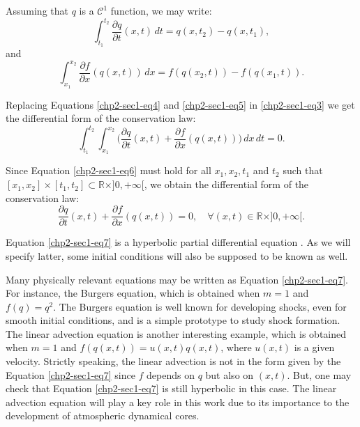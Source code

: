 Assuming that ${q}$ is a $\mathcal{C}^1$ function, we may write:
\begin{equation}
	\label{chp2-sec1-eq4}
	\int_{t_1}^{t_2} 
	\frac{\partial q}{\partial t}(x,t) \,dt
	= {q}(x, t_2) - {q}(x, t_1) ,
\end{equation}
and
\begin{equation}
	\label{chp2-sec1-eq5}
	\int_{x_1}^{x_2} \frac{\partial f}{\partial x}({q}(x,t)) \,dx 
	= {f}({q}(x_2, t)) -
	{f}( {q}(x_1, t)) .
\end{equation}

Replacing Equations \eqref{chp2-sec1-eq4} and \eqref{chp2-sec1-eq5}
in \eqref{chp2-sec1-eq3} we get the differential form of the conservation law:
\begin{equation}
	\label{chp2-sec1-eq6}
	\int_{t_1}^{t_2} \int_{x_1}^{x_2} 
	\bigg( \frac{\partial q}{\partial t}(x, t) 
	+ \frac{\partial f}{\partial x}({q}(x, t)) \bigg) 
	\,dx \,dt  = 0.
\end{equation}

Since Equation \eqref{chp2-sec1-eq6} must hold for all $x_1, x_2, t_1$ and $t_2$ such that
$[x_1, x_2] \times [t_1, t_2] \subset \mathbb{R}\times ]0, +\infty[$, we obtain the differential form of the conservation law:
\begin{equation}
	\label{chp2-sec1-eq7}
	\frac{\partial q}{\partial t}(x, t) +
	\frac{\partial f}{\partial x} ({q}(x, t))
	= 0, \quad \forall (x,t) \in \mathbb{R}\times ]0, +\infty[. 
\end{equation}

Equation \eqref{chp2-sec1-eq7}
is a hyperbolic partial differential equation \citep{leveque:1990}. As we will 
specify latter, some initial conditions will also be supposed to be known as well.

Many physically relevant equations may be written as Equation \eqref{chp2-sec1-eq7}.
For instance, the Burgers equation, which is obtained when
$m = 1$ and $f(q) = q^2$. The Burgers equation is well known for developing shocks,
even for smooth initial conditions, and is a simple prototype to study shock formation.
The linear advection equation is another interesting example, which is obtained
when $m = 1$ and $f(q(x,t)) = u(x,t)q(x,t)$, where $u(x,t)$ is a given velocity.
Strictly speaking, the linear advection is not in the form given by the Equation
\eqref{chp2-sec1-eq7} since $f$ depends on $q$ but also on $(x,t)$.
But, one may check that Equation \eqref{chp2-sec1-eq7} is still hyperbolic
in this case. The linear advection equation will play a key role in this work due to its importance
to the development of atmospheric dynamical cores.

